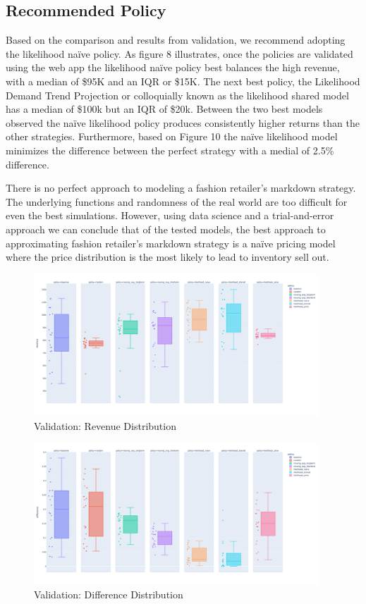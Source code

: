 \documentclass[11pt,a4paper]{article}
\begin{document}
\pagebreak
\subsection{Recommended Policy}
Based on the comparison and results from validation, we recommend adopting the likelihood naïve policy. 
As figure 8 illustrates, once the policies are validated using the web app the likelihood naïve policy best balances the high revenue, with a median of \$95K and an IQR or \$15K. 
The next best policy, the Likelihood Demand Trend Projection or colloquially known as the likelihood shared model has a median of \$100k but an IQR of \$20k. 
Between the two best models observed the naïve likelihood policy produces consistently higher returns than the other strategies. Furthermore, based on Figure 10 the naïve likelihood model minimizes the difference between the perfect strategy with a medial of 2.5\% difference. 

There is no perfect approach to modeling a fashion retailer’s markdown strategy. The underlying functions and randomness of the real world are too difficult for even the best simulations. 
However, using data science and a trial-and-error approach we can conclude that of the tested models, the best approach to approximating fashion retailer’s markdown strategy is a naïve pricing model where the price distribution is the most likely to lead to inventory sell out. 
\pagebreak
\hfill \break
\hfill \break

\begin{figure}[h]
    \centering
    \includegraphics[width=0.95\textwidth]{pic/f9.png}
    \caption{Validation: Revenue Distribution}
\end{figure}
\hfill \break
\begin{figure}[h]
    \centering
    \includegraphics[width=0.95\textwidth]{pic/f10.png}
    \caption{Validation: Difference Distribution}
\end{figure}

\pagebreak


\end{document}

